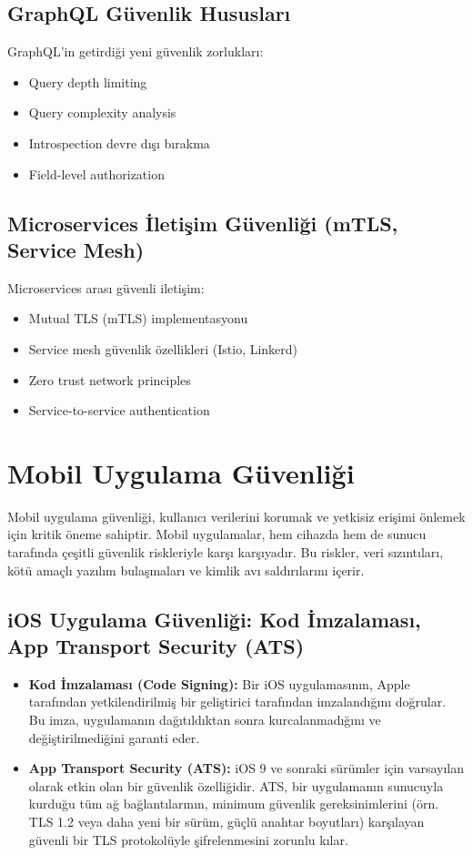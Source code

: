 \subsection{GraphQL Güvenlik Hususları}

GraphQL'in getirdiği yeni güvenlik zorlukları:

\begin{itemize}
\item Query depth limiting
\item Query complexity analysis
\item Introspection devre dışı bırakma
\item Field-level authorization
\end{itemize}

\subsection{Microservices İletişim Güvenliği (mTLS, Service Mesh)}

Microservices arası güvenli iletişim:

\begin{itemize}
\item Mutual TLS (mTLS) implementasyonu
\item Service mesh güvenlik özellikleri (Istio, Linkerd)
\item Zero trust network principles
\item Service-to-service authentication
\end{itemize}

\section{Mobil Uygulama Güvenliği}

Mobil uygulama güvenliği, kullanıcı verilerini korumak ve yetkisiz erişimi önlemek için kritik öneme sahiptir. Mobil uygulamalar, hem cihazda hem de sunucu tarafında çeşitli güvenlik riskleriyle karşı karşıyadır. Bu riskler, veri sızıntıları, kötü amaçlı yazılım bulaşmaları ve kimlik avı saldırılarını içerir.

\subsection{iOS Uygulama Güvenliği: Kod İmzalaması, App Transport Security (ATS)}

\begin{itemize}
\item \textbf{Kod İmzalaması (Code Signing):} Bir iOS uygulamasının, Apple tarafından yetkilendirilmiş bir geliştirici tarafından imzalandığını doğrular. Bu imza, uygulamanın dağıtıldıktan sonra kurcalanmadığını ve değiştirilmediğini garanti eder.
\item \textbf{App Transport Security (ATS):} iOS 9 ve sonraki sürümler için varsayılan olarak etkin olan bir güvenlik özelliğidir. ATS, bir uygulamanın sunucuyla kurduğu tüm ağ bağlantılarının, minimum güvenlik gereksinimlerini (örn. TLS 1.2 veya daha yeni bir sürüm, güçlü anahtar boyutları) karşılayan güvenli bir TLS protokolüyle şifrelenmesini zorunlu kılar.
\end{itemize}
